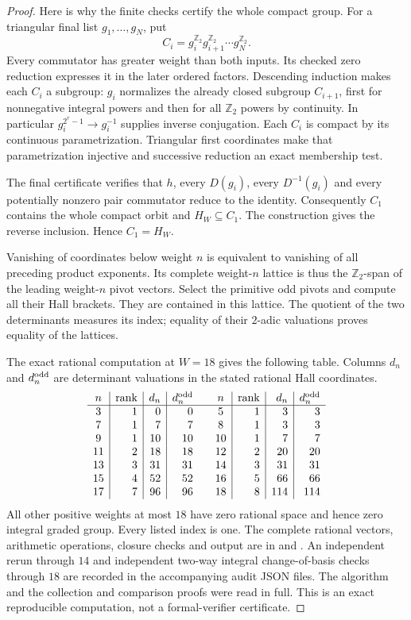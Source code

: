 \documentclass[11pt,a4paper]{article}
\theoremstyle{definition}
\begin{document}
\begin{proof}
Here is why the finite checks certify the whole compact group.
For a triangular final list $g_1,\ldots,g_N$, put
\[
 C_i=g_i^{\mathbb Z_2}g_{i+1}^{\mathbb Z_2}\cdots
                         g_N^{\mathbb Z_2}.
\]
Every commutator has greater weight than both inputs. Its checked
zero reduction expresses it in the later ordered factors.
Descending induction makes each $C_i$ a subgroup: $g_i$
normalizes the already closed subgroup $C_{i+1}$, first for
nonnegative integral powers and then for all $\mathbb Z_2$
powers by continuity. In particular
$g_i^{2^r-1}\to g_i^{-1}$ supplies inverse conjugation.
Each $C_i$ is compact by its continuous parametrization.
Triangular first coordinates make that parametrization
injective and successive reduction an exact membership test.

The final certificate verifies that $h$, every $D(g_i)$,
every $D^{-1}(g_i)$ and every potentially nonzero pair
commutator reduce to the identity. Consequently $C_1$ contains
the whole compact orbit and $H_W\subseteq C_1$. The construction
gives the reverse inclusion. Hence $C_1=H_W$.

Vanishing of coordinates below weight $n$ is equivalent to
vanishing of all preceding product exponents. Its complete
weight-$n$ lattice is thus the $\mathbb Z_2$-span of the leading
weight-$n$ pivot vectors. Select the primitive odd pivots and
compute all their Hall brackets. They are contained in this
lattice. The quotient of the two determinants measures its
index; equality of their $2$-adic valuations proves equality
of the lattices.

The exact rational computation at $W=18$ gives the following
table. Columns $d_n$ and $d_n^{\rm odd}$ are determinant
valuations in the stated rational Hall coordinates.
\[
\begin{array}{c|r|r|r@{\qquad}c|r|r|r}
n&\mathrm{rank}&d_n&d_n^{\rm odd}&
n&\mathrm{rank}&d_n&d_n^{\rm odd}\\\hline
3&1&0&0&5&1&3&3\\
7&1&7&7&8&1&3&3\\
9&1&10&10&10&1&7&7\\
11&2&18&18&12&2&20&20\\
13&3&31&31&14&3&31&31\\
15&4&52&52&16&5&66&66\\
17&7&96&96&18&8&114&114
\end{array}
\]
All other positive weights at most $18$ have zero rational
space and hence zero integral graded group. Every listed index
is one. The complete rational vectors, arithmetic operations,
closure checks and output are in
 and
.
An independent rerun through $14$ and independent two-way
integral change-of-basis checks through $18$ are recorded in
the accompanying audit JSON files. The algorithm and the
collection and comparison proofs were read in full. This is
an exact reproducible computation, not a formal-verifier
certificate.
\end{proof}
\end{document}
